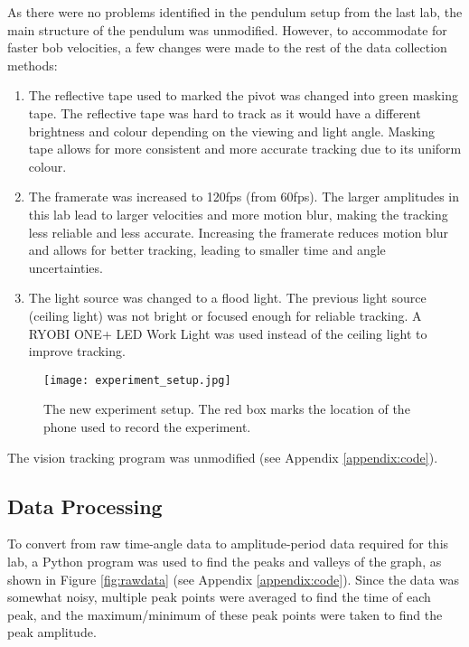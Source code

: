 \documentclass[aps,twocolumn,secnumarabic,nobalancelastpage,amsmath,amssymb,nofootinbib,floatfix]{revtex4}
\begin{document}
As there were no problems identified in the pendulum setup from the last lab, the main structure of the pendulum was
unmodified. However, to accommodate for faster bob velocities, a few changes were made to the rest of the data
collection methods:

\begin{enumerate}
    \item The reflective tape used to marked the pivot was changed into green masking tape. The reflective tape was
          hard to track as it would have a different brightness and colour depending on the viewing and light angle.
          Masking tape allows for more consistent and more accurate tracking due to its uniform colour.
    \item The framerate was increased to 120fps (from 60fps). The larger amplitudes in this lab lead to larger
          velocities and more motion blur, making the tracking less reliable and less accurate. Increasing the framerate
          reduces motion blur and allows for better tracking, leading to smaller time and angle uncertainties.
    \item The light source was changed to a flood light. The previous light source (ceiling light) was not bright or
          focused enough for reliable tracking. A RYOBI ONE+ LED Work Light was used instead of the ceiling light to
          improve tracking.
\end{enumerate}

\begin{figure}[htb]
    \texttt{[image: experiment\_setup.jpg]}
    \caption{The new experiment setup. The red box marks the location of the phone used to record the experiment.}
\end{figure}

The vision tracking program was unmodified (see Appendix \ref{appendix:code}).

\subsection{Data Processing}

To convert from raw time-angle data to amplitude-period data required for this lab, a Python program was used to find
the peaks and valleys of the graph, as shown in Figure \ref{fig:rawdata} (see Appendix \ref{appendix:code}).
Since the data was somewhat noisy, multiple peak points were averaged to find the time of each peak, and the
maximum/minimum of these peak points were taken to find the peak amplitude.
\end{document}
